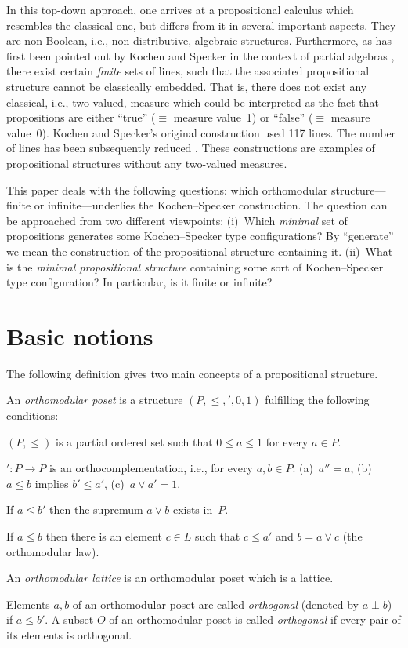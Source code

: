 In this top-down approach, one arrives at a propositional calculus which
resembles the classical one, but differs from it in several important
aspects. They are non-Boolean, i.e., non-distributive, algebraic structures.
Furthermore, as has first been pointed out by Kochen and Specker in the
context of partial algebras \cite{kochen-specker-65}, there exist certain
{\em finite\/} sets of lines, such that the associated propositional
structure cannot be classically embedded. That is, there does not exist any
classical, i.e., two-valued, measure which could be interpreted as the fact
that propositions are either ``true'' ($\equiv$ measure value~1) or
``false'' ($\equiv$ measure value~0). Kochen and Specker's original
construction used 117 lines. The number of lines has been subsequently
reduced \cite{Peres1,Peres2,Mermin,Schuette}. These constructions are
examples of propositional structures without any two-valued measures.


This paper deals with the following questions: which orthomodular
structure---finite or infinite---underlies the Kochen--Specker construction.
The question can be approached from two different viewpoints: (i)~Which {\em
minimal\/} set of propositions generates some Kochen--Specker type
configurations? By ``generate'' we mean the construction of the
propositional structure containing it. (ii)~What is the {\em minimal
propositional structure\/} containing some sort of Kochen--Specker type
configuration? In particular, is it finite or infinite?




\section {Basic notions}


The following definition gives two main concepts of a propositional
structure.


\begin {definition}
An {\em orthomodular poset\/} is a structure $(P,\le,',0,1)$ fulfilling the
following conditions:
  \begin {conditions}
  \item
  $(P,\le)$ is a partial ordered set such that $0\le a \le 1$ for every $a
  \in P$.
  \item
  $'\colon P \to P$ is an orthocomplementation, i.e., for every $a,b \in P$:
     (a)~$a''=a$,
     (b)~$a\le b$ implies $b' \le a'$,
     (c)~$a \lor a' =1$.
  \item
  If $a \le b'$
  then the supremum $a\lor b$ exists in~$P$.
  \item
  If $a\le b$ then there is an element $c\in L$ such that $c\le a'$ and
  $b=a\lor c$ (the orthomodular law).
  \end {conditions}
An {\em orthomodular lattice\/} is an orthomodular poset which is a lattice.

Elements $a,b$ of an orthomodular poset are called {\em orthogonal\/}
(denoted by $a\perp b$) if $a\le b'$. A subset $O$ of an orthomodular poset is
called {\em orthogonal\/} if every pair of its elements is orthogonal.
\end {definition}


